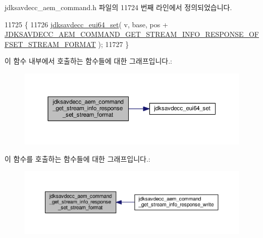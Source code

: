 jdksavdecc\+\_\+aem\+\_\+command.\+h 파일의 11724 번째 라인에서 정의되었습니다.


\begin{DoxyCode}
11725 \{
11726     \hyperlink{group__eui64_ga1c5b342315464ff77cbc7d587765432d}{jdksavdecc\_eui64\_set}( v, base, pos + 
      \hyperlink{group__command__get__stream__info__response_ga58df48ee81e8f8cc3669eaed955f86c2}{JDKSAVDECC\_AEM\_COMMAND\_GET\_STREAM\_INFO\_RESPONSE\_OFFSET\_STREAM\_FORMAT}
       );
11727 \}
\end{DoxyCode}


이 함수 내부에서 호출하는 함수들에 대한 그래프입니다.\+:
\nopagebreak
\begin{figure}[H]
\begin{center}
\leavevmode
\includegraphics[width=350pt]{group__command__get__stream__info__response_gafaa9294ecbd6f3e27d47016cc1aa3ebe_cgraph}
\end{center}
\end{figure}




이 함수를 호출하는 함수들에 대한 그래프입니다.\+:
\nopagebreak
\begin{figure}[H]
\begin{center}
\leavevmode
\includegraphics[width=350pt]{group__command__get__stream__info__response_gafaa9294ecbd6f3e27d47016cc1aa3ebe_icgraph}
\end{center}
\end{figure}


